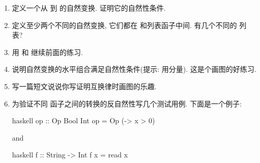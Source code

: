 \begin{enumerate}
  \tightlist
  \item
        定义一个从  到  的自然变换. 证明它的自然性条件.
  \item
        定义至少两个不同的自然变换, 它们都在  和列表函子中间.
        有几个不同的 \code{()} 列表?
  \item
        用  和  继续前面的练习.
  \item
        说明自然变换的水平组合满足自然性条件(提示: 用分量). 这是个画图的好练习.
  \item
        写一篇短文说说你写证明互换律时画图的乐趣.
  \item
        为验证不同  函子之间的转换的反自然性写几个测试用例. 下面是一个例子:

        \begin{snip}{haskell}
op :: Op Bool Int
op = Op (\x -> x > 0)
\end{snip}
        and

        \begin{snip}{haskell}
f :: String -> Int
f x = read x
\end{snip}
\end{enumerate}
